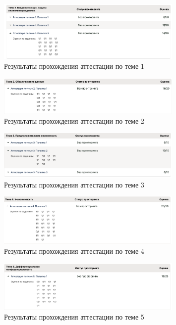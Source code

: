 \documentclass[areasetadvanced]{scrartcl}
\begin{document}
\begin{figure}[H]
    \centering
    \includegraphics[width=0.8\textwidth]{images/1.png}
    \caption{Результаты прохождения аттестации по теме 1}
    \label{fig:2}
\end{figure}

\begin{figure}[H]
    \centering
    \includegraphics[width=0.8\textwidth]{images/2.png}
    \caption{Результаты прохождения аттестации по теме 2}
    \label{fig:3}
\end{figure}

\begin{figure}[H]
    \centering
    \includegraphics[width=0.8\textwidth]{images/3.png}
    \caption{Результаты прохождения аттестации по теме 3}
    \label{fig:4}
\end{figure}               

\begin{figure}[H]
    \centering
    \includegraphics[width=0.8\textwidth]{images/4.png}
    \caption{Результаты прохождения аттестации по теме 4}
    \label{fig:5}
\end{figure}

\begin{figure}[H]
    \centering
    \includegraphics[width=0.8\textwidth]{images/5.png}
    \caption{Результаты прохождения аттестации по теме 5}
    \label{fig:6}
\end{figure}   
\end{document}
